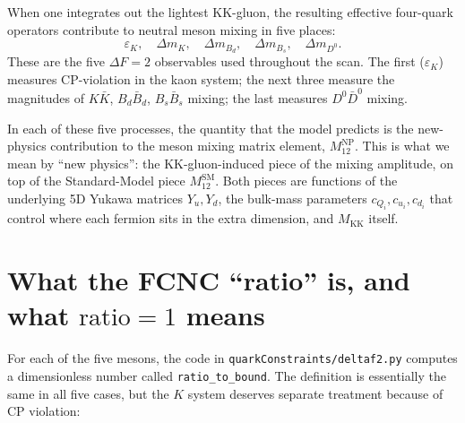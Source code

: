 \documentclass[11pt]{article}
\newcommand{\Mkk}{M_{\mathrm{KK}}}
\newcommand{\Yu}{Y_u}
\newcommand{\Yd}{Y_d}
\newcommand{\eK}{\varepsilon_K}
\newcommand{\dmK}{\Delta m_K}
\newcommand{\dmBd}{\Delta m_{B_d}}
\newcommand{\dmBs}{\Delta m_{B_s}}
\newcommand{\dmD}{\Delta m_{D^0}}
\begin{document}
When one integrates out the lightest KK-gluon, the resulting effective four-quark
operators contribute to neutral meson mixing in five places:
\begin{equation}
  \eK,\quad \dmK,\quad \dmBd,\quad \dmBs,\quad \dmD.
\end{equation}
These are the five $\Delta F = 2$ observables used throughout the scan.
The first ($\eK$) measures CP-violation in the kaon system; the next three
measure the magnitudes of $K\bar K$, $B_d\bar B_d$, $B_s\bar B_s$ mixing;
the last measures $D^0\bar D^0$ mixing.

In each of these five processes, the quantity that the model predicts is
the new-physics contribution to the meson mixing matrix element,
$M_{12}^{\mathrm{NP}}$. This is what we mean by ``new physics'': the
KK-gluon-induced piece of the mixing amplitude, on top of the
Standard-Model piece $M_{12}^{\mathrm{SM}}$. Both pieces are functions of
the underlying 5D Yukawa matrices $\Yu,\Yd$, the bulk-mass parameters
$c_{Q_i},c_{u_i},c_{d_i}$ that control where each fermion sits in the
extra dimension, and $\Mkk$ itself.

\section{What the FCNC ``ratio'' is, and what \texorpdfstring{$\mathrm{ratio} = 1$}{ratio = 1} means}
\label{sec:gate}

For each of the five mesons, the code in \texttt{quarkConstraints/deltaf2.py}
computes a dimensionless number called \texttt{ratio\_to\_bound}. The
definition is essentially the same in all five cases, but the $K$ system
deserves separate treatment because of CP violation:
\end{document}
